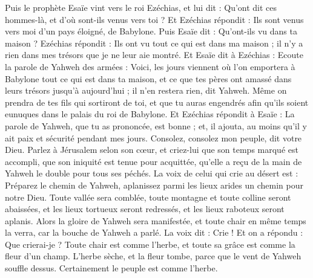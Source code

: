\begin{multicols}{2}
Puis le prophète Esaïe vint vers le roi Ezéchias, et lui dit : Qu'ont dit ces hommes-là, et d'où sont-ils venus vers toi ? Et Ezéchias répondit : Ils sont venus vers moi d'un pays éloigné, de Babylone.
Puis Esaïe dit : Qu'ont-ils vu dans ta maison ? Ezéchias répondit : Ils ont vu tout ce qui est dans ma maison ; il n'y a rien dans mes trésors que je ne leur aie montré.
Et Esaïe dit à Ezéchias : Ecoute la parole de Yahweh des armées :
Voici, les jours viennent où l'on emportera à Babylone tout ce qui est dans ta maison, et ce que tes pères ont amassé dans leurs trésors jusqu'à aujourd'hui ; il n'en restera rien, dit Yahweh.
Même on prendra de tes fils qui sortiront de toi, et que tu auras engendrés afin qu'ils soient eunuques dans le palais du roi de Babylone.
Et Ezéchias répondit à Esaïe : La parole de Yahweh, que tu as prononcée, est bonne ; et, il ajouta, au moins qu'il y ait paix et sécurité pendant mes jours.
\VerseOne{}Consolez, consolez mon peuple, dit votre Dieu.
Parlez à Jérusalem selon son cœur, et criez-lui que son temps marqué est accompli, que son iniquité est tenue pour acquittée, qu'elle a reçu de la main de Yahweh le double pour tous ses péchés.
La voix de celui qui crie au désert est : Préparez le chemin de Yahweh, aplanissez parmi les lieux arides un chemin pour notre Dieu.
Toute vallée sera comblée, toute montagne et toute colline seront abaissées, et les lieux tortueux seront redressés, et les lieux raboteux seront aplanis.
Alors la gloire de Yahweh sera manifestée, et toute chair en même temps la verra, car la bouche de Yahweh a parlé.
La voix dit : Crie ! Et on a répondu : Que crierai-je ? Toute chair est comme l'herbe, et toute sa grâce est comme la fleur d'un champ.
L'herbe sèche, et la fleur tombe, parce que le vent de Yahweh souffle dessus. Certainement le peuple est comme l'herbe.

\end{multicols}
